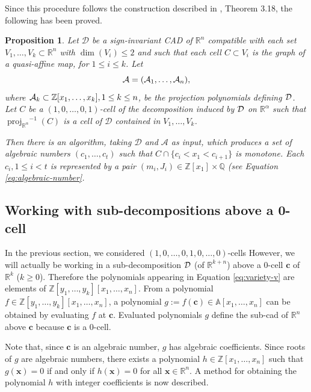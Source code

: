 \documentclass[
]{book}
\newtheorem{proposition}{Proposition}[chapter]
\theoremstyle{definition}
\theoremstyle{definition}
\theoremstyle{definition}
\theoremstyle{definition}
\theoremstyle{remark}
\begin{document}
Since this procedure follows the construction described in \citet{bgv15}, Theorem 3.18, the following has been proved.

\begin{proposition}
\protect\hypertarget{prp:monotone-sector-algorithm}{}\label{prp:monotone-sector-algorithm}Let \(\mathcal{D}\) be a sign-invariant CAD of \(\mathbb{R}^n\) compatible with each set \(V_1,\ldots,V_k \subset \mathbb{R}^n\) with \(\dim(V_i) \le 2\) and such that each cell \(C \subset V_i\) is the graph of a quasi-affine map, for \(1\le i \le k\). Let
\[
{\cal A} = ({\cal A}_1,\ldots,{\cal A}_n),
\]
where \({\cal A}_k \subset \mathbb{Z}[x_1,\ldots,x_k], 1 \le k \le n\), be the projection polynomials defining \(\cal D\).
Let \(C\) be a \((1,0,\ldots,0,1)\)-cell of the decomposition induced by \(\cal D\) on \(\mathbb{R}^{\alpha}\) such that \({\operatorname{proj}_{\mathbb{R}^{\alpha}}}^{-1}(C)\) is a cell of \(\mathcal{D}\) contained in \(V_1,\ldots,V_k\).

Then there is an algorithm, taking \(\mathcal{D}\) and \(\mathcal{A}\) as input, which produces a set of algebraic numbers \((c_1,\ldots,c_t)\) such that \(C \cap \{ c_i < x_1 < c_{i+1} \}\) is monotone. Each \(c_i, 1 \le i < t\) is represented by a pair \((m_i, J_i) \in \mathbb{Z}[x_1] \times \mathbb{Q}\) (see Equation \eqref{eq:algebraic-number}.
\end{proposition}

\hypertarget{sec:sub-cad}{%
\subsection{Working with sub-decompositions above a 0-cell}\label{sec:sub-cad}}

In the previous section, we considered \((1,0,\ldots,0,1,0,\ldots,0)\)-cells
However, we will actually be working in a sub-decomposition \(\cal D\) (of \(\mathbb{R}^{k+n}\)) above a \(0\)-cell \(\mathbf{c}\) of \(\mathbb{R}^k\) (\(k \ge 0\)). Therefore the polynomials appearing in Equation \eqref{eq:variety-v} are elements of \(\mathbb{Z}[y_1,\ldots,y_k][x_1,\ldots,x_n]\).
From a polynomial \(f \in \mathbb{Z}[y_1,\ldots,y_k][x_1,\ldots,x_n]\), a polynomial \(g := f(\mathbf{c}) \in \mathbb{A}[x_1,\ldots,x_n]\) can be obtained by evaluating \(f\) at \(\mathbf{c}\). Evaluated polynomials \(g\) define the sub-cad of \(\mathbb{R}^n\) above \(\mathbf{c}\) because \(\mathbf{c}\) is a \(0\)-cell.

Note that, since \(\mathbf{c}\) is an algebraic number, \(g\) has algebraic coefficients. Since roots of \(g\) are algebraic numbers, there exists a polynomial \(h \in \mathbb{Z}[x_1,\ldots,x_n]\) such that \(g(\mathbf{x}) = 0\) if and only if \(h(\mathbf{x}) = 0\) for all \(\mathbf{x} \in \mathbb{R}^n\). A method for obtaining the polynomial \(h\) with integer coefficients is now described.
\end{document}
